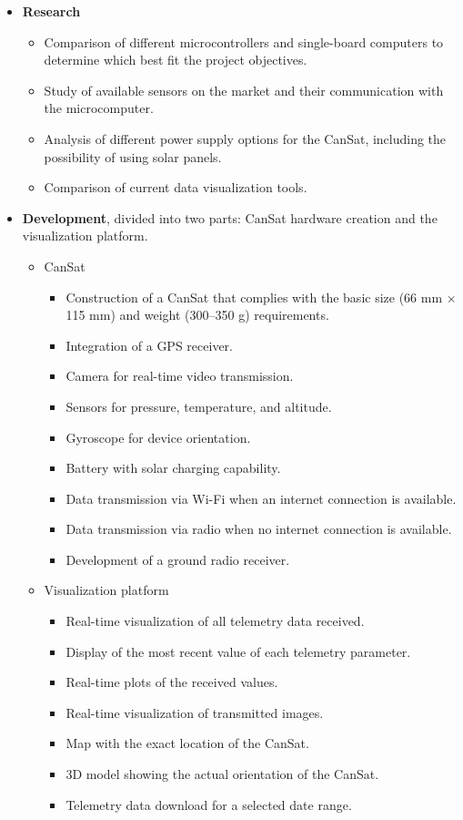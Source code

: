 \begin{itemize}
    \item \textbf{Research}
    \begin{itemize}
        \item Comparison of different microcontrollers and single-board computers to determine which best fit the project objectives.
        \item Study of available sensors on the market and their communication with the microcomputer.
        \item Analysis of different power supply options for the CanSat, including the possibility of using solar panels.
        \item Comparison of current data visualization tools.
    \end{itemize}
    \item \textbf{Development}, divided into two parts: CanSat hardware creation and the visualization platform.
    \begin{itemize}
        \item CanSat
        \begin{itemize}
            \item Construction of a CanSat that complies with the basic size (66 mm × 115 mm) and weight (300–350 g) requirements.
            \item Integration of a GPS receiver.
            \item Camera for real-time video transmission.
            \item Sensors for pressure, temperature, and altitude.
            \item Gyroscope for device orientation.
            \item Battery with solar charging capability.
            \item Data transmission via Wi-Fi when an internet connection is available.
            \item Data transmission via radio when no internet connection is available.
            \item Development of a ground radio receiver.
        \end{itemize}
        \item Visualization platform
        \begin{itemize}
            \item Real-time visualization of all telemetry data received.
            \item Display of the most recent value of each telemetry parameter.
            \item Real-time plots of the received values.
            \item Real-time visualization of transmitted images.
            \item Map with the exact location of the CanSat.
            \item 3D model showing the actual orientation of the CanSat.
            \item Telemetry data download for a selected date range.
        \end{itemize}
    \end{itemize}
\end{itemize}

